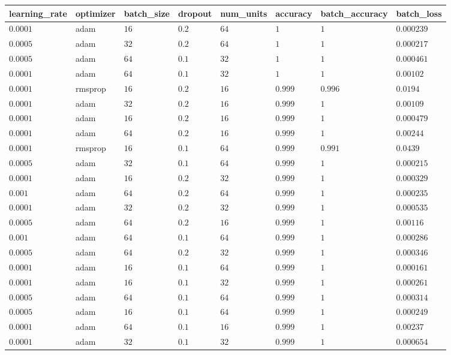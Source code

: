\begin{table}[tbp]
\begin{tabular}{llllllll}
learning\_rate & optimizer & batch\_size & dropout & num\_units & accuracy & batch\_accuracy & batch\_loss \\ \hline
$0.0001$ & adam & $16$ & $0.2$ & $64$ & $1$ & $1$ & $0.000239$ \\
$0.0005$ & adam & $32$ & $0.2$ & $64$ & $1$ & $1$ & $0.000217$ \\
$0.0005$ & adam & $64$ & $0.1$ & $32$ & $1$ & $1$ & $0.000461$ \\
$0.0001$ & adam & $64$ & $0.1$ & $32$ & $1$ & $1$ & $0.00102$ \\
$0.0001$ & rmsprop & $16$ & $0.2$ & $16$ & $0.999$ & $0.996$ & $0.0194$ \\
$0.0001$ & adam & $32$ & $0.2$ & $16$ & $0.999$ & $1$ & $0.00109$ \\
$0.0001$ & adam & $16$ & $0.2$ & $16$ & $0.999$ & $1$ & $0.000479$ \\
$0.0001$ & adam & $64$ & $0.2$ & $16$ & $0.999$ & $1$ & $0.00244$ \\
$0.0001$ & rmsprop & $16$ & $0.1$ & $64$ & $0.999$ & $0.991$ & $0.0439$ \\
$0.0005$ & adam & $32$ & $0.1$ & $64$ & $0.999$ & $1$ & $0.000215$ \\
$0.0001$ & adam & $16$ & $0.2$ & $32$ & $0.999$ & $1$ & $0.000329$ \\
$0.001$ & adam & $64$ & $0.2$ & $64$ & $0.999$ & $1$ & $0.000235$ \\
$0.0001$ & adam & $32$ & $0.2$ & $32$ & $0.999$ & $1$ & $0.000535$ \\
$0.0005$ & adam & $64$ & $0.2$ & $16$ & $0.999$ & $1$ & $0.00116$ \\
$0.001$ & adam & $64$ & $0.1$ & $64$ & $0.999$ & $1$ & $0.000286$ \\
$0.0005$ & adam & $64$ & $0.2$ & $32$ & $0.999$ & $1$ & $0.000346$ \\
$0.0001$ & adam & $16$ & $0.1$ & $64$ & $0.999$ & $1$ & $0.000161$ \\
$0.0001$ & adam & $16$ & $0.1$ & $32$ & $0.999$ & $1$ & $0.000261$ \\
$0.0005$ & adam & $64$ & $0.1$ & $64$ & $0.999$ & $1$ & $0.000314$ \\
$0.0005$ & adam & $16$ & $0.1$ & $64$ & $0.999$ & $1$ & $0.000249$ \\
$0.0001$ & adam & $64$ & $0.1$ & $16$ & $0.999$ & $1$ & $0.00237$ \\
$0.0001$ & adam & $32$ & $0.1$ & $32$ & $0.999$ & $1$ & $0.000654$ \\

\end{tabular}
\end{table}
